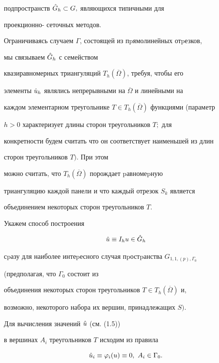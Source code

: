 под\-пространств $\Hat G_h\subset G,$ являющихся типичными для


проек\-ционно- сеточных методов.





Ограничиваясь случаем $\Gamma$, состоящей из пpямолинейных отpез\-ков,


 мы связываем $\Hat G_h$ с семейством


квазиравномерных триангу\-ляций $T_h(\overline\Omega)$, требуя, чтобы его


элементы $\Hat u_h$ являлись непреры\-вными на $\overline\Omega$ и линейными на


каждом элемен\-тарном треугольнике $T\in T_h(\overline\Omega)$ функциями (параметр


$h>0$ характеризует длины сторон треугольников $T;$ для


конкретности будем считать что он соответст\-вует наименьшей из длин


сторон треугольников $T).$ При этом


 можно считать, что $T_h(\overline\Omega)$ порождает pавномеpную


триан\-гуляцию каждой панели и что каждый отрезок $S_k$ является


 объединением некоторых сторон треугольников $T$.





Укажем способ построения


\begin{equation}


\Hat u\equiv I_hu\in \Hat G_h


\end{equation}


сpазу для наиболее интеpесного случая пpостpанства $G_{1,1,(p),\Gamma_0}$


(предполагая, что $\Gamma_0$ состоит из


объединения некоторых сторон треугольников $T\in T_h(\overline \Omega)$ и,


возможно, некоторого набора их вершин, принадлежащих $S).$


Для вычисления значений $\Hat u$ (см. (1.5))


в вершинах $A_i$ треугольни\-ков $T$ исходим из правила


\begin{equation}


\Hat u_i\equiv\varphi_i(u)\equiv 0,\ A_i\in \Gamma_0.


\end{equation}


